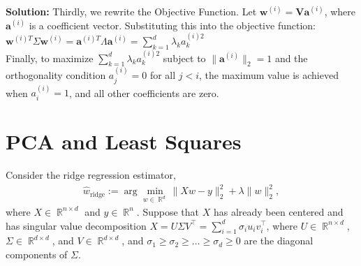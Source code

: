 \documentclass{article}
\newcommand{\Question}[1]{\Large \section{ #1 } \normalsize}
\DeclareMathOperator{\R}{\mathbb{R}}
\newenvironment{solution}{\color{blue} \smallskip \textbf{Solution:}}{}
\begin{document}
\begin{enumerate}
\begin{solution}
Thirdly, we rewrite the Objective Function. Let \(\mathbf{w}^{(i)} = \mathbf{V} \mathbf{a}^{(i)}\), where \(\mathbf{a}^{(i)}\) is a coefficient vector. Substituting this into the objective function:
\(\mathbf{w}^{(i)T} \Sigma \mathbf{w}^{(i)} = \mathbf{a}^{(i)T} \Lambda \mathbf{a}^{(i)} = \sum_{k=1}^{d} \lambda_k a_k^{(i)2}\)\\

Finally, to maximize \(\sum_{k=1}^{d} \lambda_k a_k^{(i)2}\) subject to \(\|\mathbf{a}^{(i)}\|_2 = 1\) and the orthogonality condition \(a_j^{(i)} = 0\) for all \(j < i\), the maximum value is achieved when \(a_i^{(i)} = 1\), and all other coefficients are zero.




\end{solution}
\end{enumerate}

\newpage


\Question {PCA and Least Squares}


\newcommand{\hatwPCA}{\hat{ {w}}_\text{{PCA}}}
\newcommand{\rhoPCA}{\rho_k}
\newcommand{\hatwridge}{ \hat{{w}}_{\text{ridge}}}
\newcommand{\hatwOLS}{ \hat{{w}}_{\text{OLS}}}
\newcommand{\Sigk}{ {\Sigma}_k}
\newcommand{\wrp}{\widehat{  w}_{\mathrm{RP}}}

Consider the ridge regression estimator, 
\begin{align*}
\widehat{  w}_{\mathrm{ridge}} := \arg \min_{  w \in \R^d} \|  X   w -   y\|_2^2 + \lambda \|  w\|_2^2,
\end{align*}
where $X \in \R^{n \times d}$ and $y \in \R^n$. Suppose that $X$ has already been centered and has singular value decomposition $X = U \Sigma V^\top = \sum_{i=1}^d \sigma_i u_i v_i^\top$, where $U \in \R^{n \times d}$, $\Sigma \in \R^{d \times d}$, and $V \in \R^{d \times d}$, and $\sigma_1 \ge \sigma_2 \ge \dots \ge \sigma_d \ge 0$ are the diagonal components of $\Sigma$.
\end{document}
